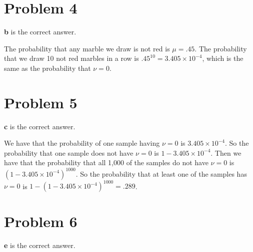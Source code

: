 \documentclass{article}
\begin{document}
\section*{Problem 4}
\textbf{b} is the correct answer.

\noindent The probability that any marble we draw is not red is $\mu = .45$.
The probability that we draw 10 not red marbles in a row is $.45^{10} = 3.405
\times 10^{-4}$, which is the same as the probability that $\nu = 0$.
\section*{Problem 5}
\textbf{c} is the correct answer.

\noindent We have that the probability of one sample having $\nu = 0$ is
$3.405 \times
10^{-4}$. So the probability that one sample does not have $\nu = 0$
is $1 - 3.405 \times 10^{-4}$. Then we have that the probability that all
1,000 of the samples do not have $\nu = 0$ is $(1 - 3.405 \times 10^{-4})^{1000}$.
So the probability that at least one of the samples has $\nu = 0$ is
$1 - (1 - 3.405 \times 10^{-4})^{1000} = .289$.
\section*{Problem 6}
\textbf{e} is the correct answer.
\end{document}
